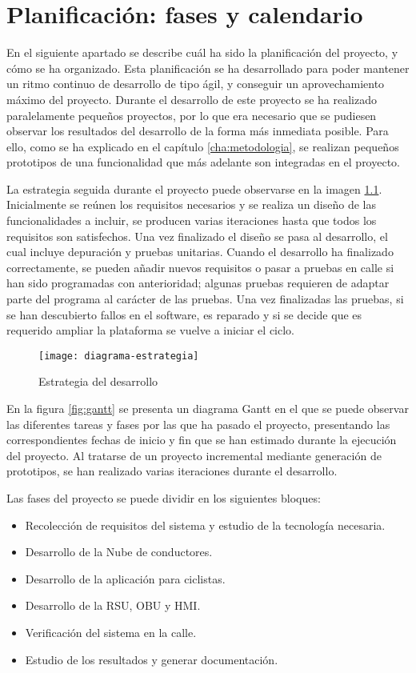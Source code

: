 \chapter{Planificación: fases y calendario}
En el siguiente apartado se describe cuál ha sido la planificación del proyecto, y cómo se ha organizado. Esta planificación se ha desarrollado para poder mantener un ritmo continuo de desarrollo de tipo ágil, y conseguir un aprovechamiento máximo del proyecto. Durante el desarrollo de este proyecto se ha realizado paralelamente pequeños proyectos, por lo que era necesario que se pudiesen observar los resultados del desarrollo de la forma más inmediata posible. Para ello, como se ha explicado en el capítulo \ref{cha:metodologia}, se realizan pequeños prototipos de una funcionalidad que más adelante son integradas en el proyecto.

La estrategia seguida durante el proyecto puede observarse en la imagen \ref{fig:estrategia}. Inicialmente se reúnen los requisitos necesarios y se realiza un diseño de las funcionalidades a incluir, se producen varias iteraciones hasta que todos los requisitos son satisfechos. Una vez finalizado el diseño se pasa al desarrollo, el cual incluye depuración y pruebas unitarias. Cuando el desarrollo ha finalizado correctamente, se pueden añadir nuevos requisitos o pasar a pruebas en calle si han sido programadas con anterioridad; algunas pruebas requieren de adaptar parte del programa al carácter de las pruebas. Una vez finalizadas las pruebas, si se han descubierto fallos en el software, es reparado y si se decide que es requerido ampliar la plataforma se vuelve a iniciar el ciclo.
\begin{figure}[H]
	\begin{center}
		\texttt{[image: diagrama-estrategia]}
		\caption{Estrategia del desarrollo}
		\label{fig:estrategia}
	\end{center}
\end{figure}

En la figura \ref{fig:gantt} se presenta un diagrama Gantt en el que se puede observar las diferentes tareas y fases por las que ha pasado el proyecto, presentando las correspondientes fechas de inicio y fin que se han estimado durante la ejecución del proyecto. Al tratarse de un proyecto incremental mediante generación de prototipos, se han realizado varias iteraciones durante el desarrollo.

Las fases del proyecto se puede dividir en los siguientes bloques:
\begin{itemize}
	\item Recolección de requisitos del sistema y estudio de la tecnología necesaria.
	\item Desarrollo de la Nube de conductores.
	\item Desarrollo de la aplicación para ciclistas.
	\item Desarrollo de la RSU, OBU y HMI.
	\item Verificación del sistema en la calle.
	\item Estudio de los resultados y generar documentación.
\end{itemize}

